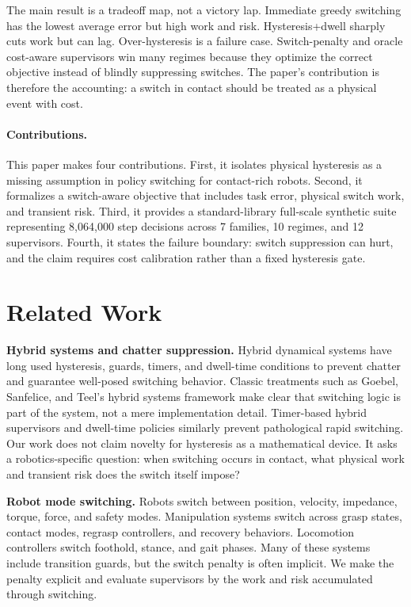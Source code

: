 \documentclass{article}
\begin{document}
The main result is a tradeoff map, not a victory lap.
Immediate greedy switching has the lowest average error but high work and risk.
Hysteresis+dwell sharply cuts work but can lag.
Over-hysteresis is a failure case.
Switch-penalty and oracle cost-aware supervisors win many regimes because they optimize the correct objective instead of blindly suppressing switches.
The paper's contribution is therefore the accounting: a switch in contact should be treated as a physical event with cost.

\paragraph{Contributions.}
This paper makes four contributions.
First, it isolates physical hysteresis as a missing assumption in policy switching for contact-rich robots.
Second, it formalizes a switch-aware objective that includes task error, physical switch work, and transient risk.
Third, it provides a standard-library full-scale synthetic suite representing 8,064,000 step decisions across 7 families, 10 regimes, and 12 supervisors.
Fourth, it states the failure boundary: switch suppression can hurt, and the claim requires cost calibration rather than a fixed hysteresis gate.

\section{Related Work}

\textbf{Hybrid systems and chatter suppression.}
Hybrid dynamical systems have long used hysteresis, guards, timers, and dwell-time conditions to prevent chatter and guarantee well-posed switching behavior.
Classic treatments such as Goebel, Sanfelice, and Teel's hybrid systems framework make clear that switching logic is part of the system, not a mere implementation detail.
Timer-based hybrid supervisors and dwell-time policies similarly prevent pathological rapid switching.
Our work does not claim novelty for hysteresis as a mathematical device.
It asks a robotics-specific question: when switching occurs in contact, what physical work and transient risk does the switch itself impose?

\textbf{Robot mode switching.}
Robots switch between position, velocity, impedance, torque, force, and safety modes.
Manipulation systems switch across grasp states, contact modes, regrasp controllers, and recovery behaviors.
Locomotion controllers switch foothold, stance, and gait phases.
Many of these systems include transition guards, but the switch penalty is often implicit.
We make the penalty explicit and evaluate supervisors by the work and risk accumulated through switching.
\end{document}
